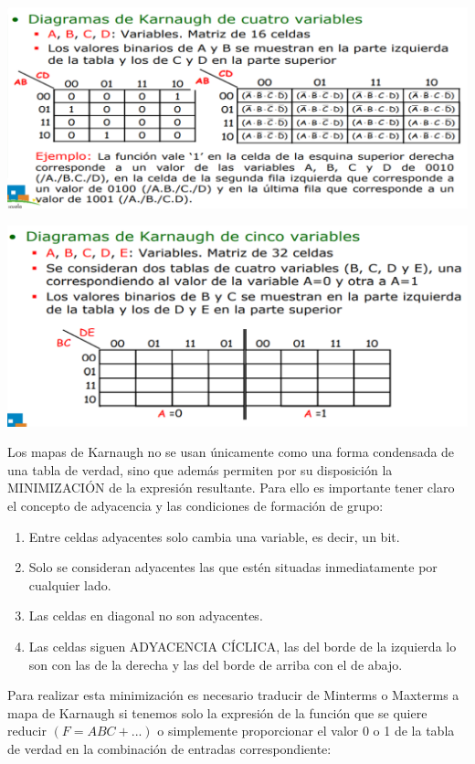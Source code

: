 \documentclass[a4paper,10pt]{book}
\begin{document}
\begin{center}
\includegraphics[scale=0.75]{mapas 2}
\end{center}

\begin{center}
\includegraphics[scale=0.75]{mapas 3}
\end{center}

Los mapas de Karnaugh no se usan únicamente como una forma condensada de una tabla de verdad, sino que además permiten por su disposición la MINIMIZACIÓN de la expresión resultante. Para ello es importante tener claro el concepto de adyacencia y las condiciones de formación de grupo:
\begin{enumerate}
\item Entre celdas adyacentes solo cambia una variable, es decir, un bit.
\item Solo se consideran adyacentes las que estén situadas inmediatamente por cualquier lado.
\item Las celdas en diagonal no son adyacentes.
\item Las celdas siguen ADYACENCIA CÍCLICA, las del borde de la izquierda lo son con las de la derecha y las del borde de arriba con el de abajo.
\end{enumerate}

Para realizar esta minimización es necesario traducir de Minterms o Maxterms a mapa de Karnaugh si tenemos solo la expresión de la función que se quiere reducir $(F=ABC+...)$ o simplemente proporcionar el valor 0 o 1 de la tabla de verdad en la combinación de entradas correspondiente:
\end{document}
